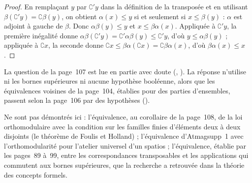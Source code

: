 \begin{proof}
En remplaçant $y$ par $\complement' y$ dans la définition de la transposée et en utilisant $\beta(\complement' y) = \complement \beta(y)$, on obtient $\alpha(x) \leq y$ si et seulement si $x \leq \beta(y)$ : $\alpha$ est adjoint à gauche de $\beta$. Donc $\alpha\beta(y) \leq y$ et $x \leq \beta\alpha(x)$. Appliquée à $\complement' y$, la première inégalité donne $\alpha\beta(\complement' y) = \complement' \alpha\beta(y) \leq \complement' y$, d'où $y \leq \alpha\beta(y)$ ; appliquée à $\complement x$, la seconde donne $\complement x \leq \beta\alpha(\complement x) = \complement \beta\alpha(x)$, d'où $\beta\alpha(x) \leq x$.
\end{proof}

La question de la page~107 est lue en partie avec doute (, ). La réponse n'utilise ni les bornes supérieures ni aucune hypothèse booléenne, alors que les équivalences voisines de la page~104, établies pour des parties d'ensembles, passent selon la page~106 par des hypothèses  ().

Ne sont pas démontrés ici : l'équivalence, au corollaire de la page~108, de la loi orthomodulaire avec la condition sur les familles finies d'éléments deux à deux disjoints (le théorème de Foulis et Holland) ; l'équivalence d'Atmagsupp~1 avec l'orthomodularité pour l'atelier universel d'un spatios ; l'équivalence, établie par les pages~89 à~99, entre les correspondances transposables et les applications qui commutent aux bornes supérieures, que la recherche a retrouvée dans la théorie des concepts formels.
